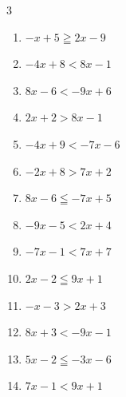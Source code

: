 \begin{multicols}{3}
\begin{enumerate}
  \item $-x+5\geqq 2x-9$


  \item $-4x+8<8x-1$


  \item $8x-6<-9x+6$


  \item $2x+2>8x-1$


  \item $-4x+9<-7x-6$

        \phantom{$\displaystyle x<-5$}

  \item $-2x+8>7x+2$


  \item $8x-6\leqq -7x+5$


  \item $-9x-5<2x+4$


  \item $-7x-1<7x+7$


  \item $2x-2\leqq 9x+1$


  \item $-x-3>2x+3$

        \phantom{$\displaystyle x<-2$}

  \item $8x+3<-9x-1$


  \item $5x-2\leqq -3x-6$


\columnbreak %

  \item $7x-1<9x+1$


\end{enumerate}
\end{multicols}
